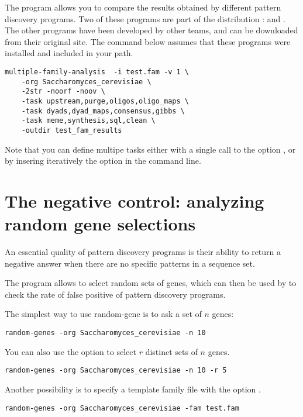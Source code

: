 The program  allows you to compare
the results obtained by different pattern discovery programs. Two of
these programs are part of the \RSAT distribution :
 and . The other
programs have been developed by other teams, and can be downloaded
from their original site. The command below assumes that these
programs were installed and included in your path.

\begin{verbatim}
multiple-family-analysis  -i test.fam -v 1 \
    -org Saccharomyces_cerevisiae \
    -2str -noorf -noov \
    -task upstream,purge,oligos,oligo_maps \
    -task dyads,dyad_maps,consensus,gibbs \
    -task meme,synthesis,sql,clean \
    -outdir test_fam_results
\end{verbatim}

Note that you can define multipe tasks either with a single call to
the option \option{-task}, or by insering iteratively the option in
the command line.

\section{The negative control: analyzing random gene selections}

An essential quality of pattern discovery programs is their ability to
 return a negative answer when there are no specific patterns in a
 sequence set.

The program \program{random-genes} allows to select random sets of
 genes, which can then be used by 
 to check the rate of false positive of pattern discovery programs.

The simplest way to use random-gene is to ask a set of $n$ genes:

\begin{verbatim}
random-genes -org Saccharomyces_cerevisiae -n 10
\end{verbatim}

You can also use the option \option{-r} to select $r$ distinct sets of
$n$ genes.

\begin{verbatim}
random-genes -org Saccharomyces_cerevisiae -n 10 -r 5
\end{verbatim}

Another possibility is to specify a template family file with the
 option .

\begin{verbatim}
random-genes -org Saccharomyces_cerevisiae -fam test.fam
\end{verbatim}


